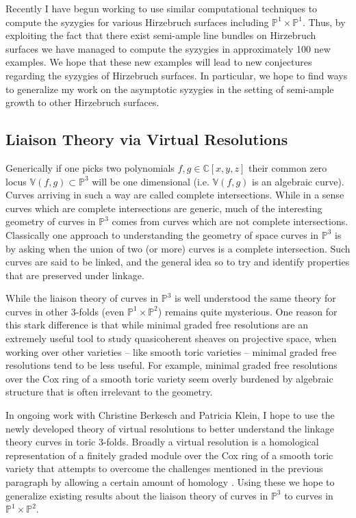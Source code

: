 \documentclass[10pt,reqno]{amsart}
\theoremstyle{remark}
\newcommand{\C}{\mathbb{C}}
\renewcommand{\P}{\mathbb{P}}
\newcommand{\V}{\mathbb{V}}
\begin{document}
Recently I have begun working to use similar computational techniques to compute the syzygies for various Hirzebruch surfaces including $\P^1\times\P^1$. Thus, by exploiting the fact that there exist semi-ample line bundles on Hirzebruch surfaces we have managed to compute the syzygies in approximately 100 new examples. We hope that these new examples will lead to new conjectures regarding the syzygies of Hirzebruch surfaces. In particular, we hope to find ways to generalize my work on the asymptotic syzygies in the setting of semi-ample growth to other Hirzebruch surfaces. 

\subsection{Liaison Theory via Virtual Resolutions}

Generically if one picks two polynomials $f,g\in \C[x,y,z]$ their common zero locus $\V(f,g)\subset \P^3$ will be one dimensional (i.e. $\V(f,g)$ is an algebraic curve). Curves arriving in such a way are called complete intersections. While in a sense curves which are complete intersections are generic, much of the interesting geometry of curves in $\P^3$ comes from curves which are not complete intersections. Classically one approach to understanding the geometry of space curves in $\P^3$ is by asking when the union of two (or more) curves is a complete intersection. Such curves are said to be linked, and the general idea so to try and identify properties that are preserved under linkage. 

While the liaison theory of curves in $\P^3$ is well understood the same theory for curves in other 3-folds (even $\P^1\times\P^2$) remains quite mysterious. One reason for this stark difference is that while minimal graded free resolutions are an extremely useful tool to study quasicoherent sheaves on projective space, when working over other varieties -- like smooth toric varieties --  minimal graded free resolutions tend to be less useful. For example, minimal graded free resolutions over the Cox ring of a smooth toric variety seem overly burdened by algebraic structure that is often irrelevant to the geometry. 

In ongoing work with Christine Berkesch and Patricia Klein, I hope to use the newly developed theory of virtual resolutions to better understand the linkage theory curves in toric 3-folds. Broadly a virtual resolution is a homological representation of a finitely graded module over the Cox ring of a smooth toric variety that attempts to overcome the challenges mentioned in the previous paragraph by allowing a certain amount of homology \cite{berkeschErmanSmith17}. Using these we hope to generalize existing results about the liaison theory of  curves in $\P^3$ to curves in $\P^1\times\P^2$. 
\end{document}
